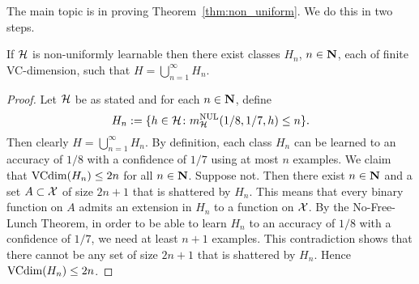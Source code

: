 The main topic is in proving Theorem~\ref{thm:non_uniform}. We do this in two steps.
\begin{lemma}\label{lemma:if_side}
If $\mathcal{H}$ is non-uniformly learnable then there exist classes $H_n$, $n \in \mathbf{N}$, each
of finite VC-dimension, such that $H = \bigcup_{n = 1}^{\infty} H_n$.
\end{lemma}
\begin{proof}
Let $\mathcal{H}$ be as stated and for each $n \in \mathbf{N}$, define
\[
    H_n := \{h \in \mathcal{H} \colon m_{\mathcal{H}}^{\text{NUL}} (1/8, 1/7, h) \leq n\}.
\]
Then clearly $H = \bigcup_{n = 1}^{\infty} H_n$. By definition, each class $H_n$ 
can be learned to an accuracy of $1/8$ with a confidence of $1/7$ using at most $n$
examples. We claim that $\text{VCdim} (H_n) \leq 2n$ for all 
$n \in \mathbf{N}$. Suppose not. Then there exist $n \in \mathbf{N}$ and a set $A \subset \mathcal{X}$ of size 
$2n + 1$ that is shattered by $H_n$. This means that every binary function on $A$ admits 
an extension in $H_n$ to a function on $\mathcal{X}$. By the No-Free-Lunch Theorem, in order 
to be able to learn $H_n$ to an accuracy of $1/8$ with a confidence of $1/7$, we need 
at least $n + 1$ examples. This contradiction shows that there cannot be any set 
of size $2n + 1$ that is shattered by $H_n$. Hence $\text{VCdim} (H_n) \leq 2n$.
\qedhere
\end{proof}

